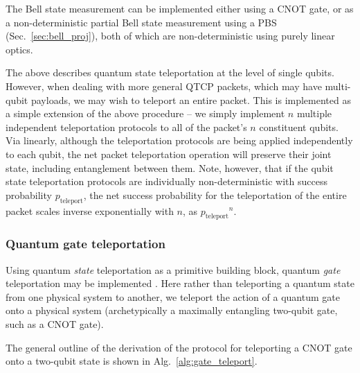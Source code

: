 \documentclass[aps, rmp, twocolumn, amsmath, amssymb, nofootinbib, superscriptaddress, longbibliography, floatfix, table-of-contents, eqsecnum]{revtex4-1}
\begin{document}
The Bell state measurement can be implemented either using a CNOT gate, or as a non-deterministic partial Bell state measurement using a PBS (Sec.~\ref{sec:bell_proj}), both of which are non-deterministic using purely linear optics.

The above describes quantum state teleportation at the level of single qubits. However, when dealing with more general QTCP packets, which may have multi-qubit payloads, we may wish to teleport an entire packet. This is implemented as a simple extension of the above procedure -- we simply implement $n$ multiple independent teleportation protocols to all of the packet's $n$ constituent qubits. Via linearly, although the teleportation protocols are being applied independently to each qubit, the net packet teleportation operation will preserve their joint state, including entanglement between them. Note, however, that if the qubit state teleportation protocols are individually non-deterministic with success probability $p_\text{teleport}$, the net success probability for the teleportation of the entire packet scales inverse exponentially with $n$, as ${p_\text{teleport}}^n$.

%
%

\subsubsection{Quantum gate teleportation} \label{sec:teleport_gate} 

Using quantum \textit{state} teleportation as a primitive building block, quantum \textit{gate} teleportation may be implemented \cite{bib:GottesmanChuang99}. Here rather than teleporting a quantum state from one physical system to another, we teleport the action of a quantum gate onto a physical system (archetypically a maximally entangling two-qubit gate, such as a CNOT gate).

The general outline of the derivation of the protocol for teleporting a CNOT gate onto a two-qubit state is shown in Alg.~\ref{alg:gate_teleport}.
\end{document}
